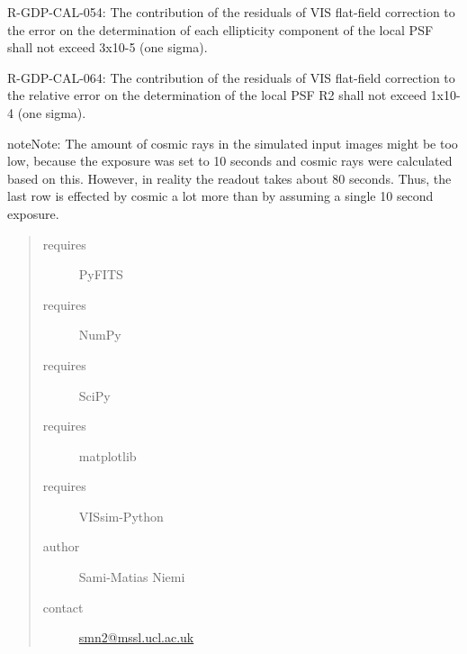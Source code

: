\documentclass[a4paper,12pt,english]{sphinxmanual}
\begin{document}
R-GDP-CAL-054:
The contribution of the residuals of VIS flat-field correction to the error on the determination of each
ellipticity component of the local PSF shall not exceed 3x10-5 (one sigma).

R-GDP-CAL-064:
The contribution of the residuals of VIS flat-field correction to the relative error on the determination
of the local PSF R2 shall not exceed 1x10-4 (one sigma).

\begin{notice}{note}{Note:}
The amount of cosmic rays in the simulated input images might be too low, because the exposure was
set to 10 seconds and cosmic rays were calculated based on this. However, in reality the readout
takes about 80 seconds. Thus, the last row is effected by cosmic a lot more than by assuming a single
10 second exposure.
\end{notice}
\begin{quote}\begin{description}
\item[{requires}] \leavevmode
PyFITS

\item[{requires}] \leavevmode
NumPy

\item[{requires}] \leavevmode
SciPy

\item[{requires}] \leavevmode
matplotlib

\item[{requires}] \leavevmode
VISsim-Python

\item[{author}] \leavevmode
Sami-Matias Niemi

\item[{contact}] \leavevmode
\href{mailto:smn2@mssl.ucl.ac.uk}{smn2@mssl.ucl.ac.uk}

\end{description}\end{quote}
\end{document}
